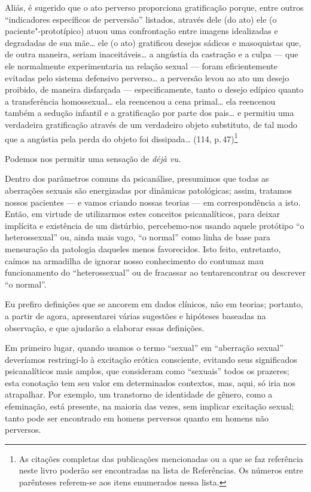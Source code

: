 Aliás, é sugerido que o ato perverso proporciona gratificação
porque, entre outros ``indicadores específicos de
perversão'' listados, através dele (do ato) ele (o
paciente"-prototípico) atuou uma confrontação entre imagens \mbox{idealizadas}
e degradadas de sua\idxmaes{} mãe\ldots{} ele (o ato) gratificou desejos sádicos e
masoquistas que, de outra maneira, seriam inaceitáveis\ldots{} a angústia da
 castração\idxcasta{} e a culpa --- que ele normalmente experimentaria na relação
sexual --- foram eficientemente evitadas pelo sistema defensivo
perverso\ldots{} a perversão levou ao ato um desejo proibido, de maneira
disfarçada --- especificamente, tanto o desejo edípico\idxconfe{} quanto a
transferência homossexual\ldots{}\idxhomos{} ela reencenou a cena primal\ldots{} ela
reencenou também a sedução infantil e a gratificação por parte dos
pais\ldots{} e permitiu uma verdadeira gratificação através de um verdadeiro
objeto substituto, de tal modo que a angústia pela perda do objeto foi
dissipada\ldots{} (114, p.\,47)\footnote{ As citações completas das
publicações mencionadas ou a que se faz referência neste livro poderão ser
encontradas na lista de Referências. Os
números entre parênteses referem-se aos itens enumerados nessa lista.}

Podemos nos permitir uma sensação de \textit{déjà vu.}

Dentro dos parâmetros comuns da psicanálise, presumimos que todas as
aberrações sexuais são energizadas por dinâmicas patológicas; assim,
tratamos nossos pacientes --- e vamos criando nossas teorias --- em
correspondência a isto. Então, em virtude de utilizarmos estes
conceitos psicanalíticos, para deixar implícita e existência de um
distúrbio, percebemo-nos usando aquele protótipo ``o
heterossexual''\idxhetero{} ou, ainda mais vago, ``o
normal''\idxnorma{} como linha de base para mensuração da patologia
daqueles menos favorecidos. Isto feito, entretanto, caímos na armadilha
de ignorar nosso conhecimento do contumaz mau funcionamento do
``heterossexual'' ou de fracassar ao tentar\idxpsicap[|)]
encontrar ou descrever ``o normal''.\idxpervnorma{}

Eu prefiro definições que se ancorem em dados clínicos, não em
teorias; portanto, a partir de agora, apresentarei várias sugestões e
hipóteses baseadas na observação, e que ajudarão a elaborar essas
definições.

Em primeiro lugar,\idxaberrdef{} quando usamos o termo ``sexual'' em ``aberração
sexual'' deveríamos restringi-lo à excitação\idxsexue{} erótica
consciente, evitando seus significados psicanalíticos mais amplos, que
consideram como ``sexuais'' todos os
prazeres; esta conotação tem seu valor em determinados contextos, mas,
aqui, só iria nos atrapalhar. Por exemplo, um transtorno de identidade
de gênero,\idxiden{} como a efeminação,\idxhomosafem{} está presente, na maioria das vezes, sem
implicar excitação sexual; tanto pode ser encontrado em homens
perversos quanto em homens não perversos.

